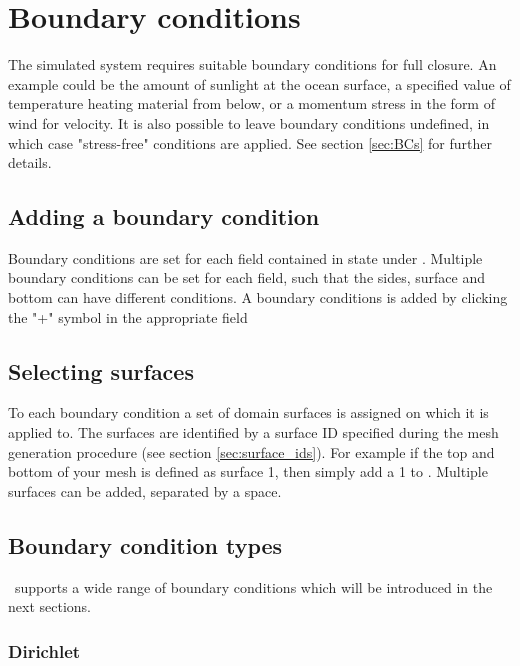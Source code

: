\section{Boundary conditions}\label{Sec:BCs_configure}


The simulated system requires suitable boundary conditions for full closure.
An example could be the amount of sunlight at the ocean surface, a specified value of
temperature heating material from below, or a momentum stress in the form of wind for velocity.
It is also possible to leave boundary conditions undefined, in which case "stress-free" conditions are
applied. See section \ref{sec:BCs} for further details.

\subsection{Adding a boundary condition}\label{sec:BCs:adding}

Boundary conditions are set for each field contained in state under . 
Multiple boundary conditions can be set for each field, such that the sides, surface and bottom can 
have different conditions. A boundary conditions is added by clicking the "+" symbol
in the appropriate field

\subsection{Selecting surfaces}\label{sec:BCs:selecting}
To each boundary condition a set of domain surfaces is assigned on which it is applied to. The surfaces are identified by a surface ID specified during the mesh generation procedure (see section \ref{sec:surface_ids}). For example if the top and bottom of your mesh is defined as surface
1, then simply add a 1 to . Multiple surfaces 
can be added, separated by a space.

\subsection{Boundary condition types}\label{sec:BCs:types}
\fluidity\ supports a wide range of boundary conditions which will be introduced in the next sections.

\subsubsection{Dirichlet}

